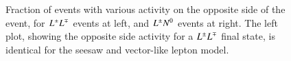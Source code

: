 \begin{figure}
	\caption{Fraction of events with various activity on the opposite side of the event, for $L^{\pm}L^{\mp}$ events at left, and $L^{\pm}N^{0}$ events at right. The left plot, showing the opposite side activity for a $L^{\pm}L^{\mp}$ final state, is identical for the seesaw and vector-like lepton model.
	}
	\label{fig:opposite-side-br}
\end{figure}

